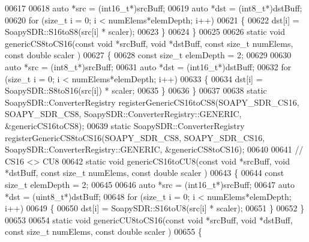\begin{DoxyCode}
00617 
00618   \textcolor{keyword}{auto} *src = (int16\_t*)srcBuff;
00619   \textcolor{keyword}{auto} *dst = (int8\_t*)dstBuff;
00620   \textcolor{keywordflow}{for} (\textcolor{keywordtype}{size\_t} i = 0; i < numElems*elemDepth; i++)
00621     \{
00622       dst[i] = SoapySDR::S16toS8(src[i] * scaler);
00623     \}
00624 \}
00625 
00626 \textcolor{keyword}{static} \textcolor{keywordtype}{void} genericCS8toCS16(\textcolor{keyword}{const} \textcolor{keywordtype}{void} *srcBuff, \textcolor{keywordtype}{void} *dstBuff, \textcolor{keyword}{const} \textcolor{keywordtype}{size\_t} numElems, \textcolor{keyword}{const} \textcolor{keywordtype}{double} scaler
      )
00627 \{
00628   \textcolor{keyword}{const} \textcolor{keywordtype}{size\_t} elemDepth = 2;
00629 
00630   \textcolor{keyword}{auto} *src = (int8\_t*)srcBuff;
00631   \textcolor{keyword}{auto} *dst = (int16\_t*)dstBuff;
00632   \textcolor{keywordflow}{for} (\textcolor{keywordtype}{size\_t} i = 0; i < numElems*elemDepth; i++)
00633     \{
00634       dst[i] = SoapySDR::S8toS16(src[i]) * scaler;
00635     \}
00636 \}
00637 
00638 \textcolor{keyword}{static} SoapySDR::ConverterRegistry registerGenericCS16toCS8(SOAPY_SDR_CS16, 
      SOAPY_SDR_CS8, SoapySDR::ConverterRegistry::GENERIC, &genericCS16toCS8);
00639 \textcolor{keyword}{static} SoapySDR::ConverterRegistry registerGenericCS8toCS16(SOAPY_SDR_CS8, 
      SOAPY_SDR_CS16, SoapySDR::ConverterRegistry::GENERIC, &genericCS8toCS16);
00640 
00641 \textcolor{comment}{// CS16 <> CU8}
00642 \textcolor{keyword}{static} \textcolor{keywordtype}{void} genericCS16toCU8(\textcolor{keyword}{const} \textcolor{keywordtype}{void} *srcBuff, \textcolor{keywordtype}{void} *dstBuff, \textcolor{keyword}{const} \textcolor{keywordtype}{size\_t} numElems, \textcolor{keyword}{const} \textcolor{keywordtype}{double} scaler
      )
00643 \{
00644   \textcolor{keyword}{const} \textcolor{keywordtype}{size\_t} elemDepth = 2;
00645 
00646   \textcolor{keyword}{auto} *src = (int16\_t*)srcBuff;
00647   \textcolor{keyword}{auto} *dst = (uint8\_t*)dstBuff;
00648   \textcolor{keywordflow}{for} (\textcolor{keywordtype}{size\_t} i = 0; i < numElems*elemDepth; i++)
00649     \{
00650       dst[i] = SoapySDR::S16toU8(src[i] * scaler);
00651     \}
00652 \}
00653 
00654 \textcolor{keyword}{static} \textcolor{keywordtype}{void} genericCU8toCS16(\textcolor{keyword}{const} \textcolor{keywordtype}{void} *srcBuff, \textcolor{keywordtype}{void} *dstBuff, \textcolor{keyword}{const} \textcolor{keywordtype}{size\_t} numElems, \textcolor{keyword}{const} \textcolor{keywordtype}{double} scaler
      )
00655 \{

\end{DoxyCode}
